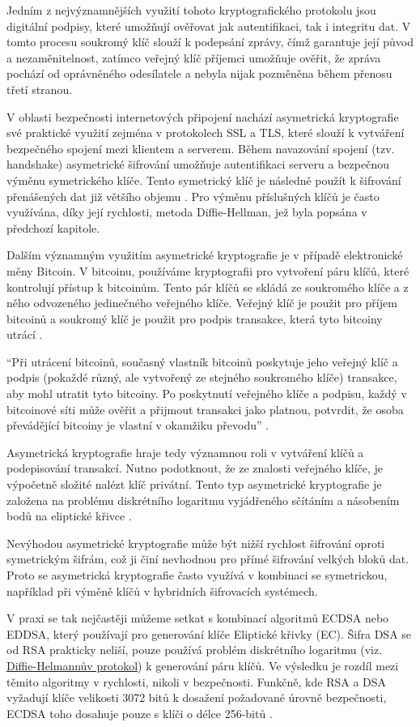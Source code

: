 \label{sec:asymetricka-kryptografie}
Jedním z nejvýznamnějších využití tohoto kryptografického protokolu jsou digitální podpisy, které umožňují ověřovat jak autentifikaci, tak i integritu dat. V tomto procesu soukromý klíč slouží k podepsání zprávy, čímž garantuje její původ a nezaměnitelnost, zatímco veřejný klíč příjemci umožňuje ověřit, že zpráva pochází od oprávněného odesílatele a nebyla nijak pozměněna během přenosu třetí stranou.

V oblasti bezpečnosti internetových připojení nachází asymetrická kryptografie své praktické využití zejména v protokolech SSL a TLS, které slouží k vytváření bezpečného spojení mezi klientem a serverem. Během navazování spojení (tzv. handshake) asymetrické šifrování umožňuje autentifikaci serveru a bezpečnou výměnu symetrického klíče. Tento symetrický klíč je následně použít k šifrování přenášených dat již většího objemu \parencite{wikijs2024}. Pro výměnu příslušných klíčů je často využívána, díky její rychlosti, metoda Diffie-Hellman, jež byla popsána v předchozí kapitole.

Dalším významným využitím asymetrické kryptografie je v případě elektronické měny Bitcoin. V bitcoinu, používáme kryptografii pro vytvoření páru klíčů, které kontrolují přístup k bitcoinům. Tento pár klíčů se skládá ze soukromého klíče a z něho odvozeného jedinečného veřejného klíče. Veřejný klíč je použit pro příjem bitcoinů a soukromý klíč je použit pro podpis transakce, která tyto bitcoiny utrácí \parencite{antonopoulos2014}.

\enquote{Při utrácení bitcoinů, současný vlastník bitcoinů poskytuje jeho veřejný klíč a podpis (pokaždé různý, ale vytvořený ze stejného soukromého klíče) transakce, aby mohl utratit tyto bitcoiny. Po poskytnutí veřejného klíče a podpisu, každý v bitcoinové síti může ověřit a přijmout transakci jako platnou, potvrdit, že osoba převádějící bitcoiny je vlastní v okamžiku převodu} \parencite{antonopoulos2014}.

Asymetrická kryptografie hraje tedy významnou roli v vytváření klíčů a podepisování transakcí. Nutno podotknout, že ze znalosti veřejného klíče, je výpočetně složité nalézt klíč privátní. Tento typ asymetrické kryptografie je založena na problému diskrétního logaritmu vyjádřeného sčítáním a násobením bodů na eliptické křivce \parencite{antonopoulos2014}.

Nevýhodou asymetrické kryptografie může být nižší rychlost šifrování oproti symetrickým šifrám, což ji činí nevhodnou pro přímé šifrování velkých bloků dat. Proto se asymetrická kryptografie často využívá v kombinaci se symetrickou, například při výměně klíčů v hybridních šifrovacích systémech.

V praxi se tak nejčastěji můžeme setkat s kombinací algoritmů ECDSA nebo EDDSA, který používají pro generování klíče Eliptické křivky (EC). Šifra DSA se od RSA prakticky neliší, pouze používá problém diskrétního logaritmu (viz. \hyperref[sec:diffie-hellman]{Diffie-Helmannův protokol}) k generování páru klíčů. Ve výsledku je rozdíl mezi těmito algoritmy v rychlosti, nikoli v bezpečnosti. Funkčně, kde RSA a DSA vyžadují klíče velikosti 3072 bitů k dosažení požadované úrovně bezpečnosti, ECDSA toho dosahuje pouze s klíči o délce 256-bitů \parencite{kontsevoy2020}.
\newpage